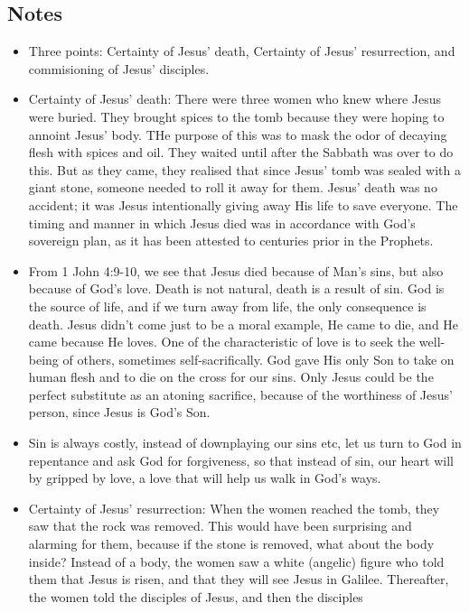 \subsection*{Notes}
\begin{itemize}
  \item{Three points: Certainty of Jesus' death, Certainty of Jesus'
  resurrection, and commisioning of Jesus' disciples.}
  \item{Certainty of Jesus' death: There were three women who knew where
  Jesus were buried.  They brought spices to the tomb because they were
  hoping to annoint Jesus' body.  THe purpose of this was to mask the odor of
  decaying flesh with spices and oil.  They waited until after the Sabbath
  was over to do this.  But as they came, they realised that since Jesus'
  tomb was sealed with a giant stone, someone needed to roll it away for
  them.  Jesus' death was no accident; it was Jesus intentionally giving away
  His life to save everyone.  The timing and manner in which Jesus died was
  in accordance with God's sovereign plan, as it has been attested to
  centuries prior in the Prophets.}
  \item{From 1 John 4:9-10, we see that Jesus died because of Man's sins, but
  also because of God's love.  Death is not natural, death is a result of
  sin.  God is the source of life, and if we turn away from life, the only
  consequence is death.  Jesus didn't come just to be a moral example, He
  came to die, and He came because He loves.  One of the characteristic of
  love is to seek the well-being of others, sometimes self-sacrifically.  God
  gave His only Son to take on human flesh and to die on the cross for our
  sins.  Only Jesus could be the perfect substitute as an atoning sacrifice,
  because of the worthiness of Jesus' person, since Jesus is God's Son.}
  \item{Sin is always costly, instead of downplaying our sins etc, let us
  turn to God in repentance and ask God for forgiveness, so that instead of
  sin, our heart will by gripped by love, a love that will help us walk in
  God's ways.}
  \item{Certainty of Jesus' resurrection: When the women reached the tomb,
  they saw that the rock was removed.  This would have been surprising and
  alarming for them, because if the stone is removed, what about the body
  inside?  Instead of a body, the women saw a white (angelic) figure who told
  them that Jesus is risen, and that they will see Jesus in Galilee.
  Thereafter, the women told the disciples of Jesus, and then the disciples
}
\end{itemize}
